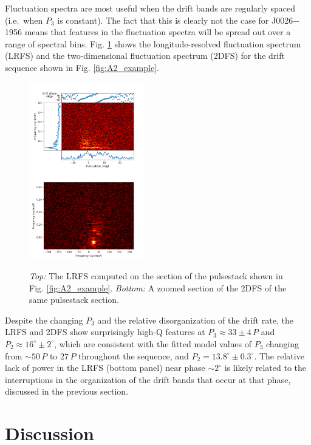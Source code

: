 \documentclass[linenumbers]{aastex631}
\newcommand{\psr}{J0026$-$1956}
\begin{document}
Fluctuation spectra are most useful when the drift bands are regularly spaced (i.e.\ when $P_3$ is constant).
The fact that this is clearly not the case for \psr{} means that features in the fluctuation spectra will be spread out over a range of spectral bins.
Fig. \ref{fig:lrfs} shows the longitude-resolved fluctuation spectrum (LRFS) and the two-dimensional fluctuation spectrum (2DFS) for the drift sequence shown in Fig. \ref{fig:A2_example}.
\begin{figure}[t]
    \centering
    \includegraphics[width=0.45\textwidth]{A2_lrfs.png} \\
    \includegraphics[width=0.45\textwidth]{A2_tdfs.png}
    \caption{\textit{Top:} The LRFS computed on the section of the pulsestack shown in Fig. \ref{fig:A2_example}. \textit{Bottom:} A zoomed section of the 2DFS of the same pulsestack section.}
    \label{fig:lrfs}
\end{figure}
Despite the changing $P_3$ and the relative disorganization of the drift rate, the LRFS and 2DFS show surprisingly high-Q features at $P_3 \approx 33 \pm 4\,P$ and $P_2 \approx 16^\circ \pm 2^\circ$, which are consistent with the fitted model values of $P_3$ changing from $\sim50\,P$ to $27\,P$ throughout the sequence, and $P_2 = 13.8^\circ \pm 0.3^\circ$.
The relative lack of power in the LRFS (bottom panel) near phase $\sim2^\circ$ is likely related to the interruptions in the organization of the drift bands that occur at that phase, discussed in the previous section.

\section{Discussion}
\label{sec:discussion}
\end{document}
